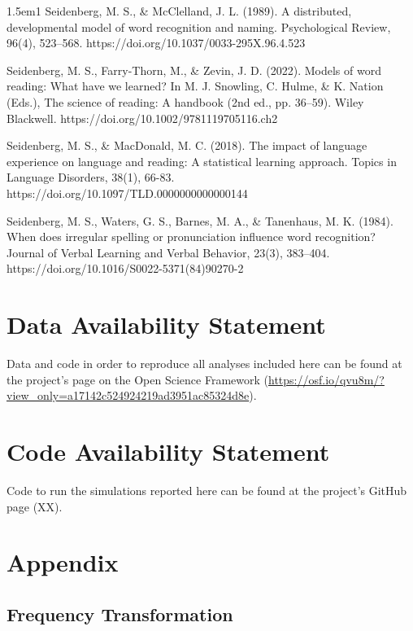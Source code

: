\documentclass[
  ,man,floatsintext]{apa6}
\begin{document}
\begin{hangparas}{1.5em}{1}
Seidenberg, M. S., \& McClelland, J. L. (1989). A distributed, developmental model of word recognition and naming. Psychological Review, 96(4), 523–568. https://doi.org/10.1037/0033-295X.96.4.523

Seidenberg, M. S., Farry-Thorn, M., \& Zevin, J. D. (2022). Models of word reading: What have we learned? In M. J. Snowling, C. Hulme, \& K. Nation (Eds.), The science of reading: A handbook (2nd ed., pp. 36–59). Wiley Blackwell. https://doi.org/10.1002/9781119705116.ch2

Seidenberg, M. S., \& MacDonald, M. C. (2018). The impact of language experience on language and reading: A statistical learning approach. Topics in Language Disorders, 38(1), 66-83. https://doi.org/10.1097/TLD.0000000000000144

Seidenberg, M. S., Waters, G. S., Barnes, M. A., \& Tanenhaus, M. K. (1984). When does irregular spelling or pronunciation influence word recognition? Journal of Verbal Learning and Verbal Behavior, 23(3), 383–404. https://doi.org/10.1016/S0022-5371(84)90270-2

\end{hangparas}

\section{Data Availability Statement}\label{data-availability-statement}

Data and code in order to reproduce all analyses included here can be found at the project's page on the Open Science Framework (\url{https://osf.io/qvu8m/?view_only=a17142c524924219ad3951ac85324d8e}).

\section{Code Availability Statement}\label{code-availability-statement}

Code to run the simulations reported here can be found at the project's GitHub page (XX).

\section{Appendix}\label{appendix}

\subsection{Frequency Transformation}\label{frequency-transformation}
\end{document}
